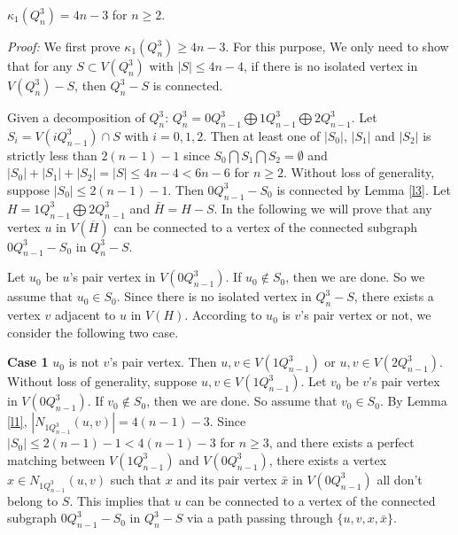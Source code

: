 \documentclass[preprint,number,12pt]{elsarticle}
\begin{document}
\begin{thm}\label{t1}
$\kappa_1(Q_{n}^{3})=4n-3$ for $n\geq 2$.
\end{thm}
\emph{Proof:}
We first prove $\kappa_1(Q_{n}^{3})\ge 4n-3$. For this purpose, We only need to show that for
any $S\subset V(Q_{n}^{3})$ with $|S| \leq 4n-4$,
if there is  no isolated vertex in $V(Q_{n}^{3})-S$, then $Q_{n}^{3}-S$ is connected.

Given a decomposition of $Q_n^3$: $Q_n^3=0Q_{n-1}^{3}\bigoplus 1Q_{n-1}^{3}\bigoplus 2Q_{n-1}^{3}$.
Let $S_{i} = V(iQ_{n-1}^{3}) \cap S$ with $i = 0, 1, 2$.
Then at least one of $|S_{0}|$, $|S_{1}|$ and $|S_{2}|$ is strictly less than $2(n-1)-1$ since $S_{0}\bigcap S_{1} \bigcap S_{2} = {\emptyset}$ and $|S_{0}|+|S_{1}|+|S_{2}| = |S| \leq 4n-4<6n-6$ for $n \geq 2$. Without loss of generality, suppose $|S_{0}| \leq 2(n-1)-1$. Then $0Q_{n-1}^{3}-S_{0}$ is connected by Lemma \ref{l3}.
Let $H=1Q_{n-1}^{3}\bigoplus 2Q_{n-1}^{3}$ and $\bar{H}=H-S$.
In the following we will prove that any vertex $u$ in $V(\overline{H})$ can be 
connected to a vertex of the connected subgraph $0Q_{n-1}^{3}-S_{0}$ in $Q_{n}^{3}-S$.

Let $u_{0}$ be $u$'s pair vertex in $V(0Q_{n-1}^{3})$. If $u_{0} \not\in S_{0}$, then we are done.
So we assume that $u_{0} \in S_{0}$. Since there is no isolated vertex in $Q_{n}^{3}-S$, there exists
a vertex $v$ adjacent to $u$ in $V(H)$. According to $u_{0}$ is $v$'s pair vertex or not,
we consider the following two case.

\textbf{Case 1 } $u_{0}$ is not $v$'s pair vertex.
Then $u,v\in V(1Q_{n-1}^{3})$ or $u,v\in V(2Q_{n-1}^{3})$.
Without loss of generality, suppose $u,v\in V(1Q_{n-1}^{3})$.
Let $v_{0}$ be $v$'s pair vertex in $V(0Q_{n-1}^{3})$. If $v_{0} \not\in S_{0}$,
then we are done. So assume that $v_0 \in S_{0}$.
By Lemma \ref{l1}, $|N_{1Q_{n-1}^{3}}(u, v)|=4(n-1)-3$.
Since $|S_0|\le 2(n-1)-1<4(n-1)-3$ for $n\ge 3$, and there exists a perfect matching between
$V(1Q_{n-1}^{3})$ and $V(0Q_{n-1}^{3})$, there exists a vertex $x \in N_{1Q_{n-1}^{3}}(u, v)$ such that
$x$ and its pair vertex $\bar{x}$ in $V(0Q_{n-1}^3)$ all don't belong to $S$.
This implies that $u$ can be connected to a vertex of the connected subgraph $0Q_{n-1}^{3}-S_0$ in $Q_{n}^{3}-S$
via a path passing through $\{u, v, x,\bar{x}\}$.
\end{document}
